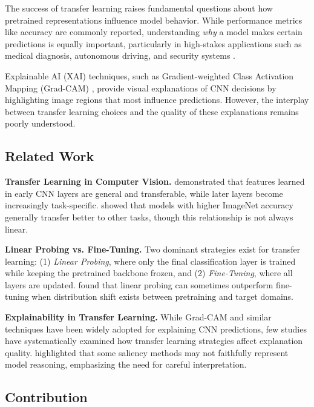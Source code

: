 \documentclass[11pt,a4paper]{article}
\begin{document}
The success of transfer learning raises fundamental questions about how pretrained representations influence model behavior. While performance metrics like accuracy are commonly reported, understanding \textit{why} a model makes certain predictions is equally important, particularly in high-stakes applications such as medical diagnosis, autonomous driving, and security systems \citep{arrieta2020explainable}.

Explainable AI (XAI) techniques, such as Gradient-weighted Class Activation Mapping (Grad-CAM) \citep{selvaraju2017grad}, provide visual explanations of CNN decisions by highlighting image regions that most influence predictions. However, the interplay between transfer learning choices and the quality of these explanations remains poorly understood.

\subsection{Related Work}

\textbf{Transfer Learning in Computer Vision.} \citet{yosinski2014transferable} demonstrated that features learned in early CNN layers are general and transferable, while later layers become increasingly task-specific. \citet{kornblith2019better} showed that models with higher ImageNet accuracy generally transfer better to other tasks, though this relationship is not always linear.

\textbf{Linear Probing vs. Fine-Tuning.} Two dominant strategies exist for transfer learning: (1) \textit{Linear Probing}, where only the final classification layer is trained while keeping the pretrained backbone frozen, and (2) \textit{Fine-Tuning}, where all layers are updated. \citet{kumar2022fine} found that linear probing can sometimes outperform fine-tuning when distribution shift exists between pretraining and target domains.

\textbf{Explainability in Transfer Learning.} While Grad-CAM \citep{selvaraju2017grad} and similar techniques have been widely adopted for explaining CNN predictions, few studies have systematically examined how transfer learning strategies affect explanation quality. \citet{adebayo2018sanity} highlighted that some saliency methods may not faithfully represent model reasoning, emphasizing the need for careful interpretation.

\subsection{Contribution}
\end{document}
